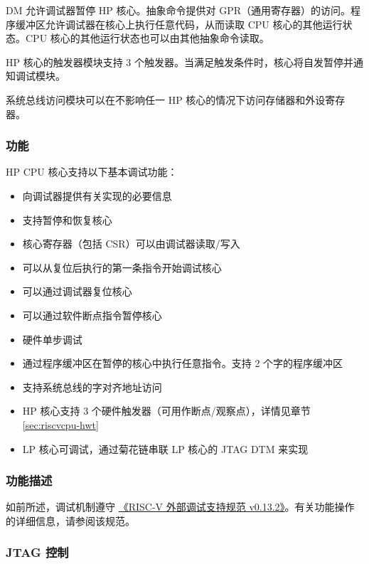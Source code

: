 \documentclass[main\_\_CN.tex]{subfiles}
\begin{document}
DM 允许调试器暂停 HP 核心。抽象命令提供对 GPR（通用寄存器）的访问。程序缓冲区允许调试器在核心上执行任意代码，从而读取 CPU 核心的其他运行状态。CPU 核心的其他运行状态也可以由其他抽象命令读取。

HP 核心的触发器模块支持 3 个触发器。当满足触发条件时，核心将自发暂停并通知调试模块。

系统总线访问模块可以在不影响任一 HP 核心的情况下访问存储器和外设寄存器。


\subsubsection{功能}
\label{sec:riscvcpu-dbg-features}

HP CPU 核心支持以下基本调试功能：

\begin{itemize}
    \item 向调试器提供有关实现的必要信息
    \item 支持暂停和恢复核心
    \item 核心寄存器（包括 CSR）可以由调试器读取/写入
    \item 可以从复位后执行的第一条指令开始调试核心
    \item 可以通过调试器复位核心
    \item 可以通过软件断点指令暂停核心
    \item 硬件单步调试
    \item 通过程序缓冲区在暂停的核心中执行任意指令。支持 2 个字的程序缓冲区
    \item 支持系统总线的字对齐地址访问
    \item HP 核心支持 3 个硬件触发器（可用作断点/观察点），详情见章节 \ref{sec:riscvcpu-hwt}
    \item LP 核心可调试，通过菊花链串联 LP 核心的 JTAG DTM 来实现
\end{itemize}

\subsubsection{功能描述}
\label{sec:riscvcpu-dbg-func-descr}

如前所述，调试机制遵守 \href{https://riscv.org/wp-content/uploads/2019/03/riscv-debug-release.pdf}{《RISC-V 外部调试支持规范 v0.13.2》}。有关功能操作的详细信息，请参阅该规范。

\subsubsection{JTAG 控制}
\label{sec:riscvcpu-dbg-jtag-cntl}
\end{document}
